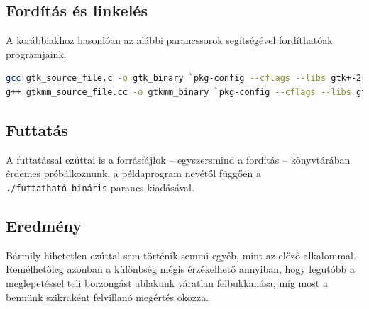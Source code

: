 \subsection{Fordítás és linkelés}

A korábbiakhoz hasonlóan az alábbi parancssorok segítségével fordíthatóak programjaink.

\begin{lstlisting}[language=bash, numbers=none, basicstyle=\ttfamily, keywordsprefix=window, keywordstyle=\itshape, basewidth={0.5em, 0.4em}]
gcc gtk_source_file.c -o gtk_binary `pkg-config --cflags --libs gtk+-2.0`
g++ gtkmm_source_file.cc -o gtkmm_binary `pkg-config --cflags --libs gtkmm-2.4`
\end{lstlisting}

\subsection{Futtatás}

A futtatással ezúttal is a forrásfájlok -- egyszersmind a fordítás -- könyvtárában érdemes próbálkoznunk, a példaprogram nevétől függően a \texttt{./futtatható\_bináris} parancs kiadásával.

\subsection{Eredmény}

Bármily hihetetlen ezúttal sem történik semmi egyéb, mint az előző alkalommal. Remélhetőleg azonban a különbség mégis érzékelhető annyiban, hogy legutóbb a meglepetéssel teli borzongást ablakunk váratlan felbukkanása, míg most a bennünk szikraként felvillanó megértés okozza.


